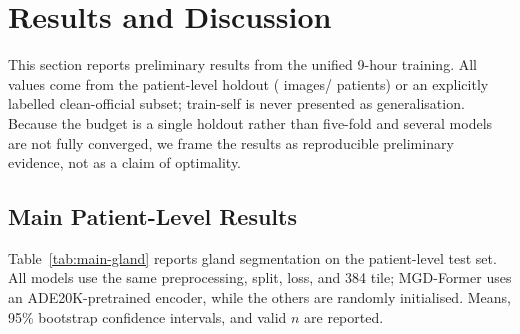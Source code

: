 \section{Results and Discussion}\label{sec:results}

This section reports preliminary results from the unified 9-hour training. All values come from the patient-level holdout (\nTest{} images/\nTestPatients{} patients) or an explicitly labelled clean-official subset; train-self is never presented as generalisation. Because the budget is a single holdout rather than five-fold and several models are not fully converged, we frame the results as reproducible preliminary evidence, not as a claim of optimality.

\subsection{Main Patient-Level Results}

Table~\ref{tab:main-gland} reports gland segmentation on the patient-level test set. All models use the same preprocessing, split, loss, and 384 tile; MGD-Former uses an ADE20K-pretrained encoder, while the others are randomly initialised. Means, 95\% bootstrap confidence intervals, and valid $n$ are reported.

\begin{table}[t]
\centering
\caption{Gland segmentation on the patient-level test set (mean; 95\% bootstrap CI in parentheses; $n=\nTest$).}
\label{tab:main-gland}
\small
{}
\end{table}

